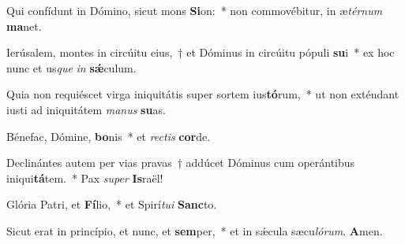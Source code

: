 \item Qui confídunt in Dómino, sicut mons \textbf{Si}on:~* non commovébitur, in æ\textit{tér}\textit{num} \textbf{ma}net.

\item Ierúsalem, montes in circúitu eius,~† et Dóminus in circúitu pópuli \textbf{su}i~* ex hoc nunc et us\textit{que} \textit{in} \textbf{sǽ}culum.

\item Quia non requiéscet virga iniquitátis super sortem ius\textbf{tó}rum,~* ut non exténdant iusti ad iniquitátem \textit{ma}\textit{nus} \textbf{su}as.

\item Bénefac, Dómine, \textbf{bo}nis~* et \textit{rec}\textit{tis} \textbf{cor}de.

\item Declinántes autem per vias pravas~† addúcet Dóminus cum operántibus iniqui\textbf{tá}tem.~* Pax \textit{su}\textit{per} \textbf{Is}raël!

\item Glória Patri, et \textbf{Fí}lio,~* et Spirí\textit{tu}\textit{i} \textbf{Sanc}to.

\item Sicut erat in princípio, et nunc, et \textbf{sem}per,~* et in sǽcula sæcu\textit{ló}\textit{rum}. \textbf{A}men.